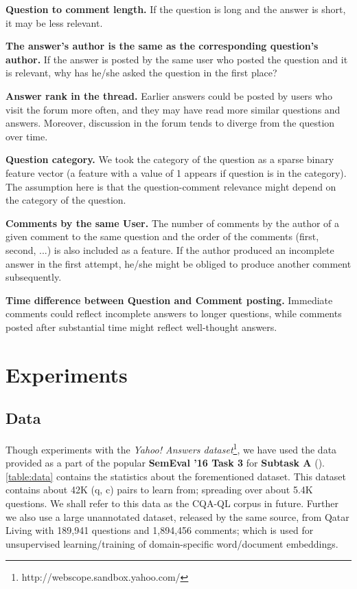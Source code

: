 \documentclass[12pt, a4paper, oneside]{Thesis} %
\newcommand{\mychapter}[2]{
    \setcounter{chapter}{#1}
    \setcounter{section}{0}
    \chapter*{#2}
    \addcontentsline{toc}{chapter}{#2}
    \lhead{\emph{#2}}
}
\begin{document}
\textbf{Question to comment length.} If the question is long and the answer is short, it may be less relevant.

\textbf{The answer’s author is the same as the corresponding question’s author.} If the answer is posted by the same user who posted the question and it is relevant, why has he/she asked the question in the first place?

\textbf{Answer rank in the thread.} Earlier answers could be posted by users who visit the forum more often, and they may have read more similar questions and answers. Moreover, discussion in the forum tends to diverge from the question over time.

\textbf{Question category.} We took the category of the question as a sparse binary feature vector (a feature with a value of 1 appears if question is in the category). The assumption here is that the question-comment relevance might depend on the category of the question.

\textbf{Comments by the same User.} The number of comments by the author of a given comment to the same question and the order of the comments (first, second, ...) is also included as a feature. If the author produced an incomplete answer in the first attempt, he/she might be obliged to produce another comment subsequently.

\textbf{Time difference between Question and Comment posting.} Immediate comments could reflect incomplete answers to longer questions, while comments posted after substantial time might reflect well-thought answers.


\mychapter{4}{Experiments}
\label{chap:exp}

\section{Data}

Though \cite{bogdanova2016we} experiments with the \textit{Yahoo! Answers dataset}\footnote{http://webscope.sandbox.yahoo.com/}, we have used the data provided as a part of the popular \textbf{SemEval '16 Task 3} for \textbf{Subtask A} (\cite{nakov-EtAl:2016:SemEval}). \autoref{table:data} contains the statistics about the forementioned dataset. This dataset contains about 42K (q, c) pairs to learn from; spreading over about 5.4K questions. We shall refer to this data as the CQA-QL corpus in future. Further we also use a large unannotated dataset, released by the same source, from Qatar Living with 189,941 questions and 1,894,456 comments; which is used for unsupervised learning/training of domain-specific word/document embeddings. \\
\end{document}
